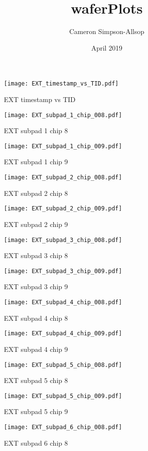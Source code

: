 \documentclass[a4paper,11pt]{article}
\title{waferPlots}
\author{Cameron Simpson-Allsop}
\date{April 2019}
\begin{document}
\begin{figure}[htbp] \centering\texttt{[image: EXT\_timestamp\_vs\_TID.pdf]}\caption{EXT timestamp vs TID} \end{figure} 
\begin{figure}[htbp] \centering\texttt{[image: EXT\_subpad\_1\_chip\_008.pdf]}\caption{EXT subpad 1 chip 8} \end{figure} 
\begin{figure}[htbp] \centering\texttt{[image: EXT\_subpad\_1\_chip\_009.pdf]}\caption{EXT subpad 1 chip 9} \end{figure} 
\begin{figure}[htbp] \centering\texttt{[image: EXT\_subpad\_2\_chip\_008.pdf]}\caption{EXT subpad 2 chip 8} \end{figure} 
\begin{figure}[htbp] \centering\texttt{[image: EXT\_subpad\_2\_chip\_009.pdf]}\caption{EXT subpad 2 chip 9} \end{figure} 
\begin{figure}[htbp] \centering\texttt{[image: EXT\_subpad\_3\_chip\_008.pdf]}\caption{EXT subpad 3 chip 8} \end{figure} 
\begin{figure}[htbp] \centering\texttt{[image: EXT\_subpad\_3\_chip\_009.pdf]}\caption{EXT subpad 3 chip 9} \end{figure} 
\begin{figure}[htbp] \centering\texttt{[image: EXT\_subpad\_4\_chip\_008.pdf]}\caption{EXT subpad 4 chip 8} \end{figure} 
\begin{figure}[htbp] \centering\texttt{[image: EXT\_subpad\_4\_chip\_009.pdf]}\caption{EXT subpad 4 chip 9} \end{figure} 
\begin{figure}[htbp] \centering\texttt{[image: EXT\_subpad\_5\_chip\_008.pdf]}\caption{EXT subpad 5 chip 8} \end{figure} 
\begin{figure}[htbp] \centering\texttt{[image: EXT\_subpad\_5\_chip\_009.pdf]}\caption{EXT subpad 5 chip 9} \end{figure} 
\begin{figure}[htbp] \centering\texttt{[image: EXT\_subpad\_6\_chip\_008.pdf]}\caption{EXT subpad 6 chip 8} \end{figure} 
\end{document}
